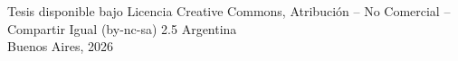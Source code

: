 \begin{center}Tesis disponible bajo Licencia Creative Commons, Atribución – No Comercial – Compartir Igual (by-nc-sa) 2.5 Argentina\\
Buenos Aires, 2026
\end{center}
